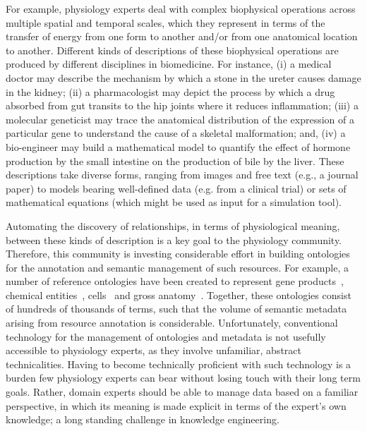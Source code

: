 For example, physiology experts deal with complex biophysical operations across multiple spatial and temporal scales, which they represent in terms of the transfer of energy from one form to another and/or from one anatomical location to another. Different kinds of descriptions of these biophysical operations are produced by different disciplines in biomedicine. For instance, (i) a medical doctor may describe the mechanism by which a stone in the ureter causes damage in the kidney; (ii) a pharmacologist may depict the process by which a drug absorbed from gut transits to the hip joints where it reduces inflammation; (iii) a molecular geneticist may trace the anatomical distribution of the expression of a particular gene to understand the cause of a skeletal malformation; and, (iv) a bio-engineer may build a mathematical model to quantify the effect of hormone production by the small intestine on the production of bile by the liver. These descriptions take diverse forms, ranging from images and free text (e.g., a journal paper) to models bearing well-defined data (e.g. from a clinical trial) or sets of mathematical equations (which might be used as input for a simulation tool).

Automating the discovery of relationships, in terms of physiological meaning, between these kinds of description is a key goal to the physiology community. Therefore, this community is investing considerable effort in building ontologies for the annotation and semantic management of such resources. For example, a number of reference ontologies have been created to represent gene products~\cite{Bla+13}, chemical entities~\cite{HMD+13}, cells~\cite{BRA05} and gross anatomy~\cite{RM03}. Together, these ontologies consist of hundreds of thousands of terms, such that the volume of semantic metadata arising from resource annotation is considerable. Unfortunately, conventional technology for the management of ontologies and metadata is not usefully accessible to physiology experts, as they involve unfamiliar, abstract technicalities.
Having to become technically proficient with such technology is a burden few physiology experts can bear without losing touch with their long term goals.
Rather, domain experts should be able to manage data based on a familiar perspective, in which its meaning is made explicit in terms of the expert's own knowledge; a long standing challenge in knowledge engineering.


